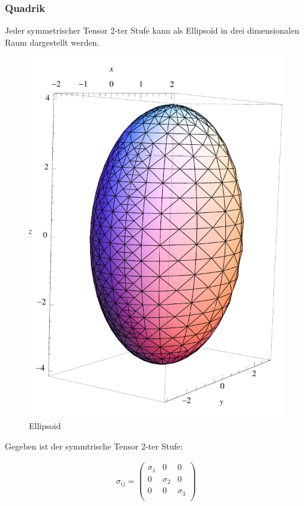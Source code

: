 \documentclass[a4paper]{scrartcl}
\begin{document}
\subsubsection{Quadrik}
Jeder symmetrischer Tensor 2-ter Stufe kann als Ellipsoid in drei dimensionalen
Raum dargestellt werden.

\begin{figure}[h]
\begin{center}
\includegraphics[scale=0.5]{images/ellipsoid.pdf}
\caption{Ellipsoid}
\label{fig:ellipsoid}
\end{center}
\end{figure}

Gegeben ist der symmtrische Tensor 2-ter Stufe:

\begin{align}
\sigma_{ij}=\begin{pmatrix}
\sigma_1 & 0 & 0 \\
0 & \sigma_2 & 0 \\
0 & 0 & \sigma_3 \\
\end{pmatrix}
\end{align}
\end{document}
